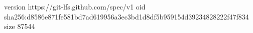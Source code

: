version https://git-lfs.github.com/spec/v1
oid sha256:d8586e871fe581bd7ad619956a3ec3bd1d8df5b959154d39234828222f47f834
size 87544
